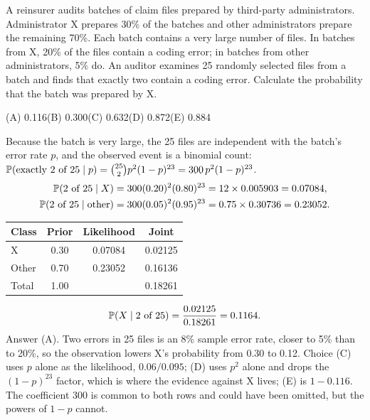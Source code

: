 \begin{example}
A reinsurer audits batches of claim files prepared by third-party administrators.
Administrator X prepares 30\% of the batches and other administrators prepare the remaining
70\%. Each batch contains a very large number of files. In batches from X, 20\% of the files
contain a coding error; in batches from other administrators, 5\% do. An auditor examines 25
randomly selected files from a batch and finds that exactly two contain a coding error.
Calculate the probability that the batch was prepared by X.
\par\smallskip\noindent (A) 0.116\qquad (B) 0.300\qquad (C) 0.632\qquad (D) 0.872\qquad (E) 0.884
\end{example}
\begin{solution}
Because the batch is very large, the 25 files are independent with the batch's error rate
$p$, and the observed event is a binomial count:
$\mathbb{P}(\text{exactly 2 of 25} \mid p) = \binom{25}{2} p^2 (1 - p)^{23} = 300\,p^2 (1 - p)^{23}$.
\begin{align*}
\mathbb{P}(\text{2 of 25} \mid X)        &= 300 (0.20)^2 (0.80)^{23} = 12 \times 0.005903 = 0.07084, \\
\mathbb{P}(\text{2 of 25} \mid \text{other}) &= 300 (0.05)^2 (0.95)^{23} = 0.75 \times 0.30736 = 0.23052.
\end{align*}
\begin{center}
\begin{tabular}{@{}lccc@{}}
\toprule
Class & Prior & Likelihood & Joint \\
\midrule
X     & 0.30 & 0.07084 & 0.02125 \\
Other & 0.70 & 0.23052 & 0.16136 \\
\midrule
Total & 1.00 & & 0.18261 \\
\bottomrule
\end{tabular}
\end{center}
\[
\mathbb{P}(X \mid \text{2 of 25}) = \frac{0.02125}{0.18261} = 0.1164.
\]
Answer (A). Two errors in 25 files is an 8\% sample error rate, closer to 5\% than to 20\%,
so the observation lowers X's probability from 0.30 to 0.12. Choice (C) uses $p$ alone as the
likelihood, $0.06/0.095$; (D) uses $p^2$ alone and drops the $(1 - p)^{23}$ factor,
which is where the evidence against X lives; (E) is $1 - 0.116$. The coefficient 300 is
common to both rows and could have been omitted, but the powers of $1 - p$ cannot.
\end{solution}

